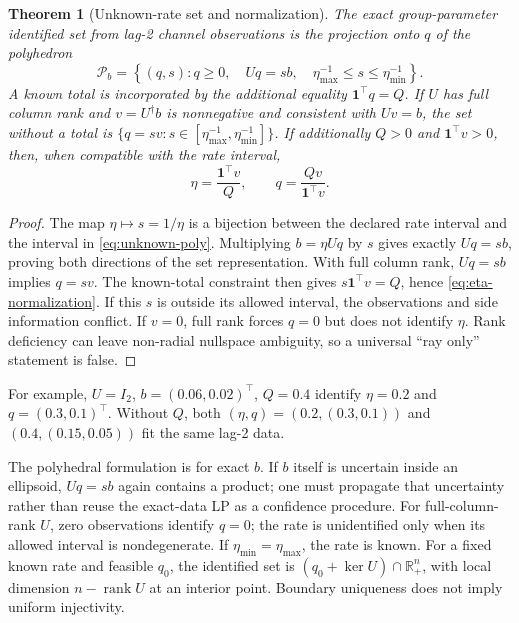 \documentclass[11pt,a4paper]{article}
\newtheorem{theorem}{Theorem}[section]
\theoremstyle{definition}\newtheorem{definition}[theorem]{Definition}
\theoremstyle{remark}\newtheorem{remark}[theorem]{Remark}
\newcommand{\one}{\mathbf 1}\newcommand{\diag}{\operatorname{diag}}
\newcommand{\rank}{\operatorname{rank}}\newcommand{\supp}{\operatorname{supp}}
\newcommand{\mc}{\mathcal}
\begin{document}
\begin{theorem}[Unknown-rate set and normalization]\label{thm:unknown}
The exact group-parameter identified set from lag-2 channel observations is the projection onto $q$ of the polyhedron
\begin{equation}
 \mc P_b=\left\{(q,s):q\ge0,\quad Uq=sb,\quad
 \eta_{\max}^{-1}\le s\le\eta_{\min}^{-1}\right\}.
 \label{eq:unknown-poly}
\end{equation}
A known total is incorporated by the additional equality $\one^\top q=Q$.
If $U$ has full column rank and $v=U^\dagger b$ is nonnegative and consistent with $Uv=b$, the set without a total is
$\{q=sv:s\in[\eta_{\max}^{-1},\eta_{\min}^{-1}]\}$.
If additionally $Q>0$ and $\one^\top v>0$, then, when compatible with the rate interval,
\begin{equation}
 \eta=\frac{\one^\top v}{Q},\qquad
 q=\frac{Qv}{\one^\top v}.
 \label{eq:eta-normalization}
\end{equation}
\end{theorem}
\begin{proof}
The map $\eta\mapsto s=1/\eta$ is a bijection between the declared rate interval and the interval in \eqref{eq:unknown-poly}. Multiplying $b=\eta Uq$ by $s$ gives exactly $Uq=sb$, proving both directions of the set representation. With full column rank, $Uq=sb$ implies $q=sv$. The known-total constraint then gives $s\one^\top v=Q$, hence \eqref{eq:eta-normalization}. If this $s$ is outside its allowed interval, the observations and side information conflict. If $v=0$, full rank forces $q=0$ but does not identify $\eta$. Rank deficiency can leave non-radial nullspace ambiguity, so a universal ``ray only'' statement is false.
\end{proof}

For example, $U=I_2$, $b=(0.06,0.02)^\top$, $Q=0.4$ identify $\eta=0.2$ and $q=(0.3,0.1)^\top$. Without $Q$, both $(\eta,q)=(0.2,(0.3,0.1))$ and $(0.4,(0.15,0.05))$ fit the same lag-2 data.

The polyhedral formulation is for exact $b$. If $b$ itself is uncertain inside an ellipsoid, $Uq=sb$ again contains a product; one must propagate that uncertainty rather than reuse the exact-data LP as a confidence procedure. For full-column-rank $U$, zero observations identify $q=0$; the rate is unidentified only when its allowed interval is nondegenerate. If $\eta_{\min}=\eta_{\max}$, the rate is known. For a fixed known rate and feasible $q_0$, the identified set is $(q_0+\ker U)\cap\mathbb R_+^n$, with local dimension $n-\rank U$ at an interior point. Boundary uniqueness does not imply uniform injectivity.
\end{document}
